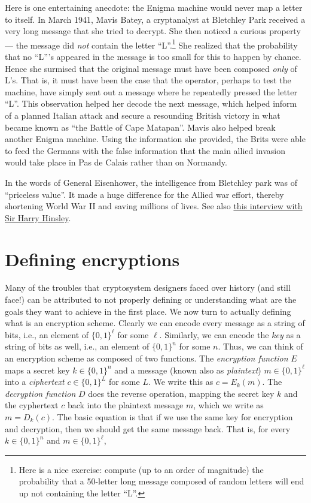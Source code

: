 Here is one entertaining anecdote: the Enigma machine would never map a
letter to itself. In March 1941, Mavis Batey, a cryptanalyst at
Bletchley Park received a very long message that she tried to decrypt.
She then noticed a curious property--- the message did \emph{not}
contain the letter ``L''.\footnote{Here is a nice exercise: compute (up
  to an order of magnitude) the probability that a 50-letter long
  message composed of random letters will end up not containing the
  letter ``L''.} She realized that the probability that no ``L'''s
appeared in the message is too small for this to happen by chance. Hence
she surmised that the original message must have been composed
\emph{only} of L's. That is, it must have been the case that the
operator, perhaps to test the machine, have simply sent out a message
where he repeatedly pressed the letter ``L''. This observation helped
her decode the next message, which helped inform of a planned Italian
attack and secure a resounding British victory in what became known as
``the Battle of Cape Matapan''. Mavis also helped break another Enigma
machine. Using the information she provided, the Brits were able to feed
the Germans with the false information that the main allied invasion
would take place in Pas de Calais rather than on Normandy.

In the words of General Eisenhower, the intelligence from Bletchley park
was of ``priceless value''. It made a huge difference for the Allied war
effort, thereby shortening World War II and saving millions of lives.
See also \href{http://www.cix.co.uk/~klockstone/hinsley.htm}{this
interview with Sir Harry Hinsley}.

\section{Defining encryptions}\label{1-Defining-encryptions}

Many of the troubles that cryptosystem designers faced over history (and
still face!) can be attributed to not properly defining or understanding
what are the goals they want to achieve in the first place. We now turn
to actually defining what is an encryption scheme. Clearly we can encode
every message as a string of bits, i.e., an element of \(\{0,1\}^\ell\)
for some \(\ell\). Similarly, we can encode the \emph{key} as a string
of bits as well, i.e., an element of \(\{0,1\}^n\) for some \(n\). Thus,
we can think of an encryption scheme as composed of two functions. The
\emph{encryption function} \(E\) maps a secret key \(k \in \{0,1\}^n\)
and a message (known also as \emph{plaintext}) \(m\in \{0,1\}^\ell\)
into a \emph{ciphertext} \(c \in \{0,1\}^L\) for some \(L\). We write
this as \(c = E_k(m)\). The \emph{decryption function} \(D\) does the
reverse operation, mapping the secret key \(k\) and the cyphertext \(c\)
back into the plaintext message \(m\), which we write as \(m = D_k(c)\).
The basic equation is that if we use the same key for encryption and
decryption, then we should get the same message back. That is, for every
\(k \in \{0,1\}^n\) and \(m\in \{0,1\}^\ell\),

